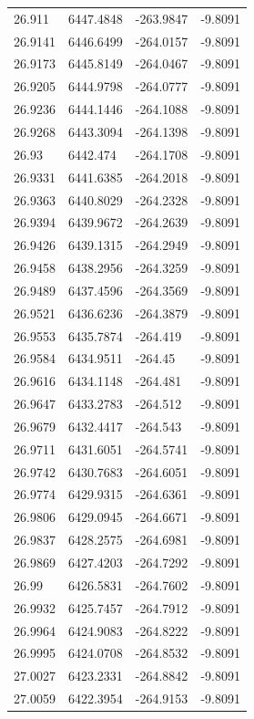 \begin{table}[H]
\begin{tabular}{llll}
26.911 & 6447.4848 & -263.9847 & -9.8091 \\
26.9141 & 6446.6499 & -264.0157 & -9.8091 \\
26.9173 & 6445.8149 & -264.0467 & -9.8091 \\
26.9205 & 6444.9798 & -264.0777 & -9.8091 \\
26.9236 & 6444.1446 & -264.1088 & -9.8091 \\
26.9268 & 6443.3094 & -264.1398 & -9.8091 \\
26.93 & 6442.474 & -264.1708 & -9.8091 \\
26.9331 & 6441.6385 & -264.2018 & -9.8091 \\
26.9363 & 6440.8029 & -264.2328 & -9.8091 \\
26.9394 & 6439.9672 & -264.2639 & -9.8091 \\
26.9426 & 6439.1315 & -264.2949 & -9.8091 \\
26.9458 & 6438.2956 & -264.3259 & -9.8091 \\
26.9489 & 6437.4596 & -264.3569 & -9.8091 \\
26.9521 & 6436.6236 & -264.3879 & -9.8091 \\
26.9553 & 6435.7874 & -264.419 & -9.8091 \\
26.9584 & 6434.9511 & -264.45 & -9.8091 \\
26.9616 & 6434.1148 & -264.481 & -9.8091 \\
26.9647 & 6433.2783 & -264.512 & -9.8091 \\
26.9679 & 6432.4417 & -264.543 & -9.8091 \\
26.9711 & 6431.6051 & -264.5741 & -9.8091 \\
26.9742 & 6430.7683 & -264.6051 & -9.8091 \\
26.9774 & 6429.9315 & -264.6361 & -9.8091 \\
26.9806 & 6429.0945 & -264.6671 & -9.8091 \\
26.9837 & 6428.2575 & -264.6981 & -9.8091 \\
26.9869 & 6427.4203 & -264.7292 & -9.8091 \\
26.99 & 6426.5831 & -264.7602 & -9.8091 \\
26.9932 & 6425.7457 & -264.7912 & -9.8091 \\
26.9964 & 6424.9083 & -264.8222 & -9.8091 \\
26.9995 & 6424.0708 & -264.8532 & -9.8091 \\
27.0027 & 6423.2331 & -264.8842 & -9.8091 \\
27.0059 & 6422.3954 & -264.9153 & -9.8091 \\

\end{tabular}
\end{table}
